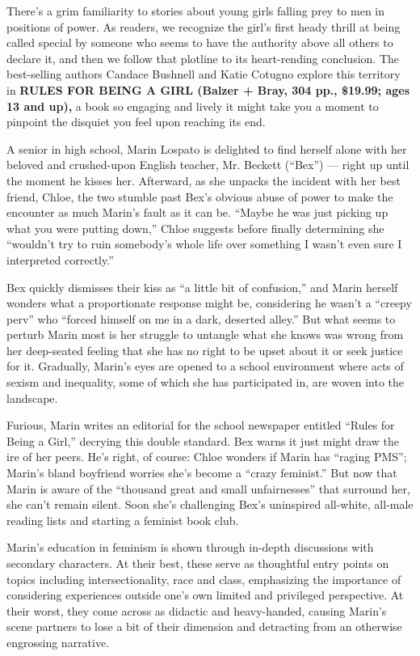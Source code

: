 There's a grim familiarity to stories about young girls falling prey to
men in positions of power. As readers, we recognize the girl's first
heady thrill at being called special by someone who seems to have the
authority above all others to declare it, and then we follow that
plotline to its heart-rending conclusion. The best-selling authors
Candace Bushnell and Katie Cotugno explore this territory in
\textbf{RULES FOR BEING A GIRL (Balzer + Bray, 304 pp., \$19.99; ages 13
and up),} a book so engaging and lively it might take you a moment to
pinpoint the disquiet you feel upon reaching its end.

A senior in high school, Marin Lospato is delighted to find herself
alone with her beloved and crushed-upon English teacher, Mr. Beckett
(``Bex'') --- right up until the moment he kisses her. Afterward, as she
unpacks the incident with her best friend, Chloe, the two stumble past
Bex's obvious abuse of power to make the encounter as much Marin's fault
as it can be. ``Maybe he was just picking up what you were putting
down,'' Chloe suggests before finally determining she ``wouldn't try to
ruin somebody's whole life over something I wasn't even sure I
interpreted correctly.''

Bex quickly dismisses their kiss as ``a little bit of confusion,'' and
Marin herself wonders what a proportionate response might be,
considering he wasn't a ``creepy perv'' who ``forced himself on me in a
dark, deserted alley.'' But what seems to perturb Marin most is her
struggle to untangle what she knows was wrong from her deep-seated
feeling that she has no right to be upset about it or seek justice for
it. Gradually, Marin's eyes are opened to a school environment where
acts of sexism and inequality, some of which she has participated in,
are woven into the landscape.

Furious, Marin writes an editorial for the school newspaper entitled
``Rules for Being a Girl,'' decrying this double standard. Bex warns it
just might draw the ire of her peers. He's right, of course: Chloe
wonders if Marin has ``raging PMS''; Marin's bland boyfriend worries
she's become a ``crazy feminist.'' But now that Marin is aware of the
``thousand great and small unfairnesses'' that surround her, she can't
remain silent. Soon she's challenging Bex's uninspired all-white,
all-male reading lists and starting a feminist book club.

Marin's education in feminism is shown through in-depth discussions with
secondary characters. At their best, these serve as thoughtful entry
points on topics including intersectionality, race and class,
emphasizing the importance of considering experiences outside one's own
limited and privileged perspective. At their worst, they come across as
didactic and heavy-handed, causing Marin's scene partners to lose a bit
of their dimension and detracting from an otherwise engrossing
narrative.

